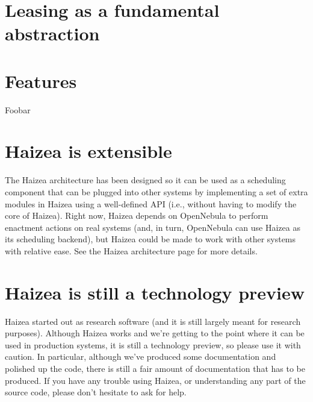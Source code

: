 \section{Leasing as a fundamental abstraction}


\section{Features}

Foobar

\section{Haizea is extensible}

The Haizea architecture has been designed so it can be used as a scheduling component that can be plugged into other systems by implementing a set of extra modules in Haizea using a well-defined API (i.e., without having to modify the core of Haizea). Right now, Haizea depends on OpenNebula to perform enactment actions on real systems (and, in turn, OpenNebula can use Haizea as its scheduling backend), but Haizea could be made to work with other systems with relative ease. See the Haizea architecture page for more details.

\section{Haizea is still a technology preview}

Haizea started out as research software (and it is still largely meant for research purposes). Although Haizea works and we're getting to the point where it can be used in production systems, it is still a technology preview, so please use it with caution. In particular, although we've produced some documentation and polished up the code, there is still a fair amount of documentation that has to be produced. If you have any trouble using Haizea, or understanding any part of the source code, please don't hesitate to ask for help.